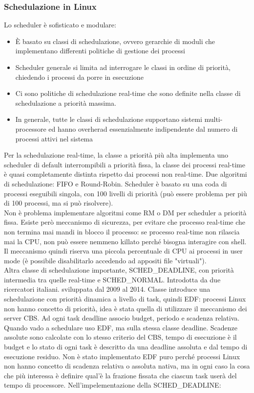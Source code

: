 \documentclass[12pt, oneside]{extbook}
\begin{document}
\subsubsection{Schedulazione in Linux}
Lo scheduler è sofisticato e modulare: 
\begin{itemize}
\item È basato su classi di schedulazione, ovvero gerarchie di moduli che implementano differenti politiche di gestione dei processi\
\item Scheduler generale si limita ad interrogare le classi in ordine di priorità, chiedendo i processi da porre in esecuzione
\item Ci sono politiche di schedulazione real-time che sono definite nella classe di schedulazione a priorità massima.
\item In generale, tutte le classi di schedulazione supportano sistemi multi-processore ed hanno overherad essenzialmente indipendente dal numero di processi attivi nel sistema
\end{itemize}
Per la schedulazione real-time, la classe a priorità più alta implementa uno scheduler di default interrompibili a priorità fissa, la classe dei processi real-time è quasi completamente distinta rispetto dai processi non real-time. Due algoritmi di schedulazione: FIFO e Round-Robin. Scheduler è basato su una coda di processi eseguibili singola, con 100 livelli di priorità (può essere problema per più di 100 processi, ma si può risolvere).\\ Non è problema implementare algoritmi come RM o DM per scheduler a priorità fissa. Esiste però meccanismo di sicurezza, per evitare che processo real-time che non termina mai mandi in blocco il processo: se processo real-time non rilascia mai la CPU, non può essere nemmeno killato perché bisogna interagire con shell. Il meccanismo quindi riserva una piccola percentuale di CPU ai processi in user mode (è possibile disabilitarlo accedendo ad appositi file "virtuali").\\ Altra classe di schedulazione importante, SCHED\_DEADLINE, con priorità intermedia tra quelle real-time e SCHED\_NORMAL. Introdotta da due ricercatori italiani. sviluppata dal 2009 al 2014. Classe introduce una schedulazione con priorità dinamica a livello di task, quindi EDF: processi Linux non hanno concetto di priorità, idea è stata quella di utilizzare il meccanismo dei server CBS. Ad ogni task deadline associo budget, periodo e scadenza relativa. Quando vado a schedulare uso EDF, ma sulla stessa classe deadline. Scadenze assolute sono calcolate con lo stesso criterio del CBS, tempo di esecuzione è il budget e lo stato di ogni task è descritto da una deadline assoluta e dal tempo di esecuzione residuo. Non è stato implementato EDF puro perché processi Linux non hanno concetto di scadenza relativa o assoluta nativa, ma in ogni caso la cosa che più interessa è definire qual'è la frazione fissata che ciascun task userà del tempo di processore. Nell'impelementazione della SCHED\_DEADLINE:
\end{document}
